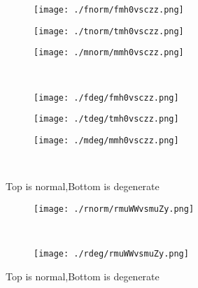 \documentclass[aps,floats,floatfix,nofootinbib]{revtex4-1}
\begin{document}
\begin{center}
\begin{figure}
\begin{subfigure}{0.3\textwidth}
\texttt{[image: ./fnorm/fmh0vsczz.png]}
\label{}
\end{subfigure}
\begin{subfigure}{0.3\textwidth}
\texttt{[image: ./tnorm/tmh0vsczz.png]}
\label{}
\end{subfigure}
\begin{subfigure}{0.3\textwidth}
\texttt{[image: ./mnorm/mmh0vsczz.png]}
\label{}
\end{subfigure}\\
\begin{subfigure}{0.3\textwidth}
\texttt{[image: ./fdeg/fmh0vsczz.png]}
\label{}
\end{subfigure}
\begin{subfigure}{0.3\textwidth}
\texttt{[image: ./tdeg/tmh0vsczz.png]}
\label{}
\end{subfigure}
\begin{subfigure}{0.3\textwidth}
\texttt{[image: ./mdeg/mmh0vsczz.png]}
\label{}
\end{subfigure}\\
\caption{Top is normal,Bottom is degenerate}
\end{figure}
\end{center}

\begin{center}
\begin{figure}
\begin{subfigure}{0.95\textwidth}
\texttt{[image: ./rnorm/rmuWWvsmuZy.png]}
\label{}
\end{subfigure}\\
\begin{subfigure}{0.95\textwidth}
\texttt{[image: ./rdeg/rmuWWvsmuZy.png]}
\label{}
\end{subfigure}
\caption{Top is normal,Bottom is degenerate}
\end{figure}
\end{center}
\end{document}
